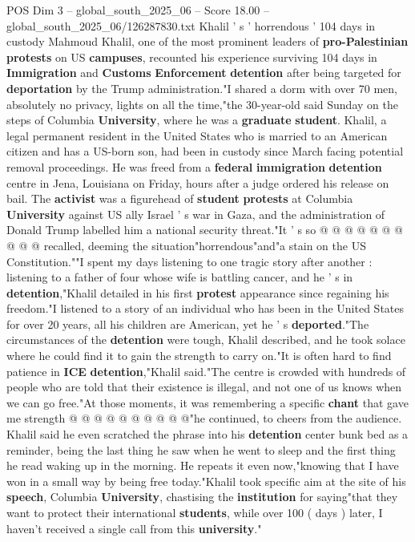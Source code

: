 \begin{textsample}{POS Dim 3 – global\_south\_2025\_06 – Score 18.00 – global\_south\_2025\_06/126287830.txt}  \label{ex:f3_pos_192}
Khalil ' s ' horrendous ' 104 days in custody Mahmoud Khalil, one of the most prominent leaders of \textbf{pro-Palestinian} \textbf{protests} on US \textbf{campuses}, recounted his experience surviving 104 days in \textbf{Immigration} and \textbf{Customs} \textbf{Enforcement} \textbf{detention} after being targeted for \textbf{deportation} by the Trump administration."I shared a dorm with over 70 men, absolutely no privacy, lights on all the time,"the 30-year-old said Sunday on the steps of Columbia \textbf{University}, where he was a \textbf{graduate} \textbf{student}.
Khalil, a legal permanent resident in the United States who is married to an American citizen and has a US-born son, had been in custody since March facing potential removal proceedings.
He was freed from a \textbf{federal} \textbf{immigration} \textbf{detention} centre in Jena, Louisiana on Friday, hours after a judge ordered his release on bail.
The \textbf{activist} was a figurehead of \textbf{student} \textbf{protests} at Columbia \textbf{University} against US ally Israel ' s war in Gaza, and the administration of Donald Trump labelled him a national security threat."It ' s so @ @ @ @ @ @ @ @ @ @ recalled, deeming the situation"horrendous"and"a stain on the US Constitution.""I spent my days listening to one tragic story after another : listening to a father of four whose wife is battling cancer, and he ' s in \textbf{detention},"Khalil detailed in his first \textbf{protest} appearance since regaining his freedom."I listened to a story of an individual who has been in the United States for over 20 years, all his children are American, yet he ' s \textbf{deported}."The circumstances of the \textbf{detention} were tough, Khalil described, and he took solace where he could find it to gain the strength to carry on."It is often hard to find patience in \textbf{ICE} \textbf{detention},"Khalil said."The centre is crowded with hundreds of people who are told that their existence is illegal, and not one of us knows when we can go free."At those moments, it was remembering a specific \textbf{chant} that gave me strength @ @ @ @ @ @ @ @ @ @"he continued, to cheers from the audience.
Khalil said he even scratched the phrase into his \textbf{detention} center bunk bed as a reminder, being the last thing he saw when he went to sleep and the first thing he read waking up in the morning.
He repeats it even now,"knowing that I have won in a small way by being free today."Khalil took specific aim at the site of his \textbf{speech}, Columbia \textbf{University}, chastising the \textbf{institution} for saying"that they want to protect their international \textbf{students}, while over 100 ( days ) later, I haven't received a single call from this \textbf{university}."

\end{textsample}

